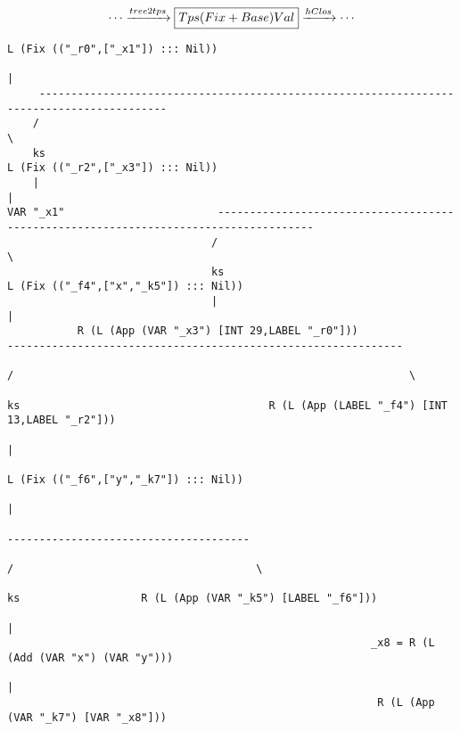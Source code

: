 \begin{landscape}
\begin{gather*}
  \cdots \xrightarrow{tree2tps} \boxed{Tps (Fix + Base) Val} \xrightarrow{hClos} \cdots
\end{gather*}
\begin{lstlisting}[basicstyle=\fontsize{6.5}{7.5}\selectfont\ttfamily]
                                                                          L (Fix (("_r0",["_x1"]) ::: Nil))
                                                                                          |
     ------------------------------------------------------------------------------------------
    /                                                                                          \
    ks                                                                         L (Fix (("_r2",["_x3"]) ::: Nil))
    |                                                                                          |
VAR "_x1"                        -------------------------------------------------------------------------------------
                                /                                                                                     \
                                ks                                                                  L (Fix (("_f4",["x","_k5"]) ::: Nil))
                                |                                                                                     |
           R (L (App (VAR "_x3") [INT 29,LABEL "_r0"]))                                        --------------------------------------------------------------
                                                                                              /                                                              \
                                                                                              ks                                       R (L (App (LABEL "_f4") [INT 13,LABEL "_r2"]))
                                                                                              |
                                                                            L (Fix (("_f6",["y","_k7"]) ::: Nil))
                                                                                              |
                                                                            --------------------------------------
                                                                           /                                      \
                                                                           ks                   R (L (App (VAR "_k5") [LABEL "_f6"]))
                                                                           |
                                                         _x8 = R (L (Add (VAR "x") (VAR "y")))
                                                                           |
                                                          R (L (App (VAR "_k7") [VAR "_x8"]))

\end{lstlisting}
\end{landscape}
\clearpage

